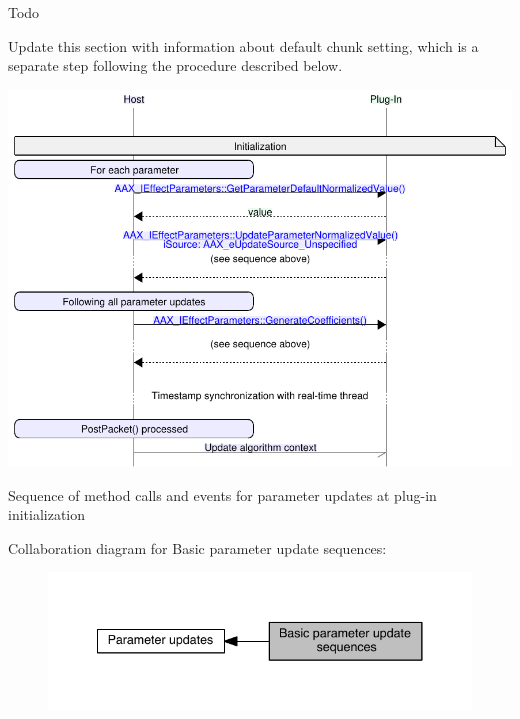 \begin{DoxyRefDesc}{Todo}
\item[\hyperlink{a00382__todo000002}{Todo}]Update this section with information about default chunk setting, which is a separate step following the procedure described below.\end{DoxyRefDesc}



\begin{DoxyImage}
\includegraphics[width=\textwidth,height=\textheight/2,keepaspectratio=true]{msc_AAX_ParameterUpdate_Initialization}
\caption{Sequence of method calls and events for parameter updates at plug-\/in initialization}
\end{DoxyImage}
 Collaboration diagram for Basic parameter update sequences\+:
\nopagebreak
\begin{figure}[H]
\begin{center}
\leavevmode
\includegraphics[width=341pt]{a00353}
\end{center}
\end{figure}
